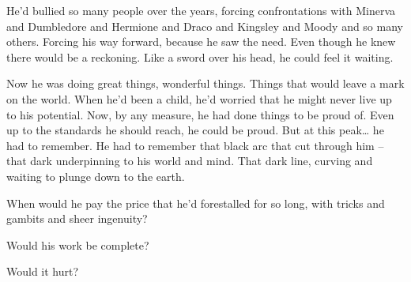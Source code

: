 He'd bullied so many people over the years, forcing confrontations with
Minerva and Dumbledore and Hermione and Draco and Kingsley and Moody and
so many others. Forcing his way forward, because he saw the need. Even
though he knew there would be a reckoning. Like a sword over his head,
he could feel it waiting.

Now he was doing great things, wonderful things. Things that would leave
a mark on the world. When he'd been a child, he'd worried that he might
never live up to his potential. Now, by any measure, he had done things
to be proud of. Even up to the standards he should reach, he could be
proud. But at this peak\ldots{} he had to remember. He had to remember
that black arc that cut through him -- that dark underpinning to his
world and mind. That dark line, curving and waiting to plunge down to
the earth.

When would he pay the price that he'd forestalled for so long, with
tricks and gambits and sheer ingenuity?

Would his work be complete?

Would it hurt?
